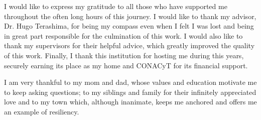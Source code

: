 I would like to express my gratitude to all those who have supported me throughout the often long hours of this journey. 
I would like to thank my advisor, Dr. Hugo Terashima, for being my compass even when I felt I was lost and being in great part responsible for the culmination of this work.
I would also like to thank my supervisors for their helpful advice, which greatly improved the quality of this work. 
Finally, I thank this institution for hosting me during this years, securely earning its place as my home and CONACyT for its financial support.

I am very thankful to my mom and dad, whose values and education motivate me to keep asking questions; to my siblings and family for their infinitely appreciated love and to my town which, although inanimate, keeps me anchored and offers me an example of resiliency. 

